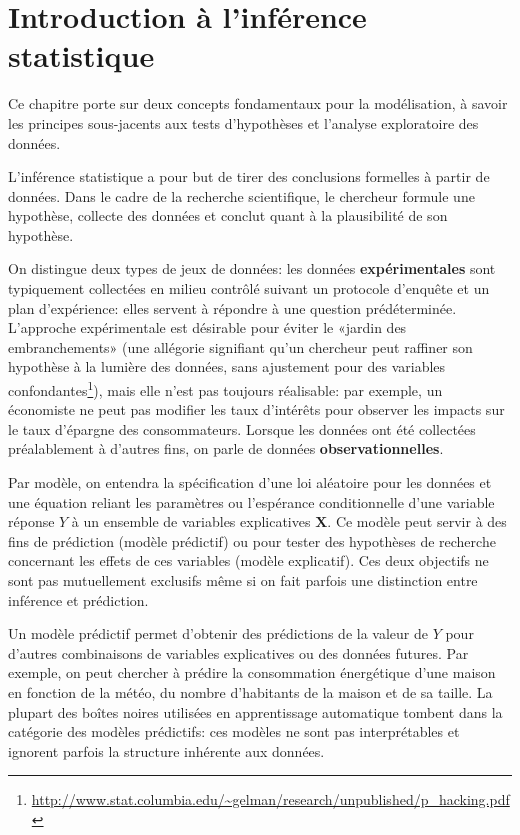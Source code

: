 \documentclass[
  11pt,
  letterpaper,
]{article}
\renewcommand{\href}[2]{#2\footnote{\url{#1}}}
\theoremstyle{definition}
\theoremstyle{definition}
\theoremstyle{definition}
\theoremstyle{remark}
\begin{document}
\hypertarget{intro}{%
\section{Introduction à l'inférence statistique}\label{intro}}

Ce chapitre porte sur deux concepts fondamentaux pour la modélisation, à savoir les principes sous-jacents aux tests d'hypothèses et l'analyse exploratoire des données.

L'inférence statistique a pour but de tirer des conclusions formelles à partir de données. Dans le cadre de la recherche scientifique, le chercheur formule une hypothèse, collecte des données et conclut quant à la plausibilité de son hypothèse.

On distingue deux types de jeux de données: les données \textbf{expérimentales} sont typiquement collectées en milieu contrôlé suivant un protocole d'enquête et un plan d'expérience: elles servent à répondre à une question prédéterminée. L'approche expérimentale est désirable pour éviter le «jardin des embranchements» (une \href{http://www.stat.columbia.edu/~gelman/research/unpublished/p_hacking.pdf}{allégorie signifiant qu'un chercheur peut raffiner son hypothèse à la lumière des données, sans ajustement pour des variables confondantes}), mais elle n'est pas toujours réalisable: par exemple, un économiste ne peut pas modifier les taux d'intérêts pour observer les impacts sur le taux d'épargne des consommateurs. Lorsque les données ont été collectées préalablement à d'autres fins, on parle de données \textbf{observationnelles}.

Par modèle, on entendra la spécification d'une loi aléatoire pour les données et une équation reliant les paramètres ou l'espérance conditionnelle d'une variable réponse \(Y\) à un ensemble de variables explicatives \(\mathbf{X}\). Ce modèle peut servir à des fins de prédiction (modèle prédictif) ou pour tester des hypothèses de recherche concernant les effets de
ces variables (modèle explicatif). Ces deux objectifs ne sont pas mutuellement exclusifs même si on fait parfois une distinction entre inférence et prédiction.

Un modèle prédictif permet d'obtenir des prédictions de la valeur de \(Y\) pour d'autres combinaisons de variables explicatives ou des données futures. Par exemple, on peut chercher à prédire la consommation énergétique d'une maison en fonction de la météo, du nombre d'habitants de la maison et de sa taille. La plupart des boîtes noires utilisées en apprentissage automatique tombent dans la catégorie des modèles prédictifs: ces modèles ne sont pas interprétables et ignorent parfois la structure inhérente aux données.
\end{document}
